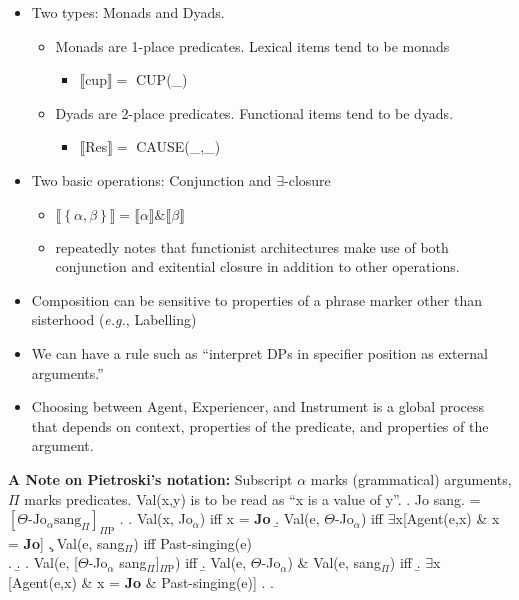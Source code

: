 \documentclass[letterpaper]{article}
\begin{document}
\begin{itemize}
  \item Two types: Monads and Dyads.
    \begin{itemize}
      \item Monads are 1-place predicates. Lexical items tend to be monads
	\begin{itemize}
	  \item $\llbracket$cup$\rrbracket = $ CUP(\_)
	\end{itemize}
      \item Dyads are 2-place predicates. Functional items tend to be dyads.
	\begin{itemize}
	  \item $\llbracket$Res$\rrbracket = $ CAUSE(\_,\_)
	\end{itemize}
    \end{itemize}
  \item Two basic operations: Conjunction and $\exists$-closure
    \begin{itemize}
      \item $\llbracket\left\{ \alpha, \beta \right\}\rrbracket = \llbracket\alpha\rrbracket \& \llbracket\beta\rrbracket$ 
      \item \textcite{pietroski2005events} repeatedly notes that functionist architectures make use of both conjunction and exitential closure in addition to other operations.
    \end{itemize}
  \item Composition can be sensitive to properties of a phrase marker other than sisterhood (\textit{e.g.}, Labelling)
  \item We can have a rule such as ``interpret DPs in specifier position as external arguments.''
  \item Choosing between Agent, Experiencer, and Instrument is a global process that depends on context, properties of the predicate, and properties of the argument.
\end{itemize}
\textbf{A Note on Pietroski's notation:} Subscript $\alpha$ marks (grammatical) arguments, $\Pi$ marks predicates.
Val(x,y) is to be read as ``x is a value of y''.
\ex. Jo sang. = $[ \Theta\text{-Jo}_\alpha \text{sang}_\Pi]_{\Pi\text{P}}$
\a. 
\a. Val(x, Jo$_\alpha$) iff x = \textbf{Jo}
\b. Val(e, $\Theta$-Jo$_\alpha$) iff $\exists$x[Agent(e,x) \& x = \textbf{Jo}]
\c. Val(e, sang$_\Pi$) iff Past-singing(e)\\
\z.
\b. 
\a. Val(e, [$\Theta$-Jo$_\alpha$ sang$_\Pi$]$_{\Pi\text{P}}$) iff
\b. Val(e, $\Theta$-Jo$_\alpha$) \& Val(e, sang$_\Pi$) iff 
\b. $\exists$x [Agent(e,x) \& x = \textbf{Jo} \& Past-singing(e)]
\z.
\z.

\printbibliography
\end{document}
